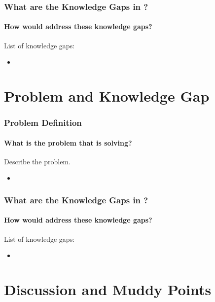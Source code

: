 \documentclass[xcolor={usenames,dvipsnames},hyperref={hyperindex,bookmarks}]{beamer}
\begin{document}
\frame
{
	\frametitle{What are the Knowledge Gaps in \cite{Hou2018}?}
	\framesubtitle{How would \cite{Hou2018} address these knowledge gaps?}

	List of knowledge gaps:
	\begin{itemize}
	\item 
	\end{itemize}

}









\section{Problem and Knowledge Gap}


\frame
{
	\frametitle{Problem Definition}
	\framesubtitle{What is the problem that \cite{Hou2018} is solving?}

	Describe the problem.
	\begin{itemize}
	\item 
	\end{itemize}

}



\frame
{
	\frametitle{What are the Knowledge Gaps in \cite{Hou2018}?}
	\framesubtitle{How would \cite{Hou2018} address these knowledge gaps?}

	List of knowledge gaps:
	\begin{itemize}
	\item 
	\end{itemize}

}




















\section{Discussion and Muddy Points}
\end{document}
